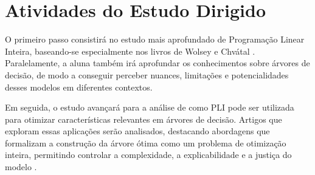 \documentclass[12pt,a4paper]{article}
\begin{document}
\section{Atividades do Estudo Dirigido}

O primeiro passo consistirá no estudo mais aprofundado de Programação Linear Inteira, baseando-se especialmente nos livros de Wolsey \cite{Wolsey2021} e Chvátal \cite{chvátal1983linear}. Paralelamente, a aluna também irá aprofundar os conhecimentos sobre árvores de decisão, de modo a conseguir perceber nuances, limitações e potencialidades desses modelos em diferentes contextos.

Em seguida, o estudo avançará para a análise de como PLI pode ser utilizada para otimizar características relevantes em árvores de decisão. Artigos que exploram essas aplicações serão analisados, destacando abordagens que formalizam a construção da árvore ótima como um problema de otimização inteira, permitindo controlar a complexidade, a explicabilidade e a justiça do modelo \cite{Bertsimas2017}.

\begingroup
\onehalfspacing
\printbibliography
\endgroup
\end{document}
